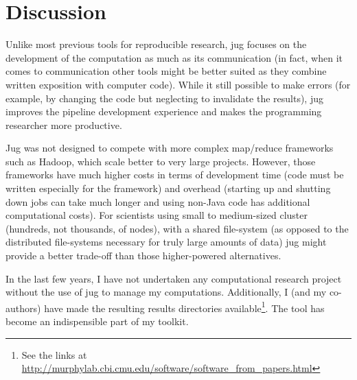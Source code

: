 \documentclass{article}
\begin{document}
\section{Discussion}
Unlike most previous tools for reproducible research, jug focuses on the
development of the computation as much as its communication (in fact, when it
comes to communication other tools might be better suited as they combine
written exposition with computer code). While it still possible to make errors
(for example, by changing the code but neglecting to invalidate the results),
jug improves the pipeline development experience and makes the programming
researcher more productive.

Jug was not designed to compete with more complex map/reduce frameworks such as
Hadoop, which scale better to very large projects. However, those frameworks
have much higher costs in terms of development time (code must be written
especially for the framework) and overhead (starting up and shutting down jobs
can take much longer and using non-Java code has additional computational
costs). For scientists using small to medium-sized cluster (hundreds, not
thousands, of nodes), with a shared file-system (as opposed to the distributed
file-systems necessary for truly large amounts of data) jug might provide a
better trade-off  than those higher-powered alternatives.

In the last few years, I have not undertaken any computational research project
without the use of jug to manage my computations. Additionally, I (and my
co-authors) have made the resulting results directories available\footnote{See
the links at
\url{http://murphylab.cbi.cmu.edu/software/software_from_papers.html}}. The
tool has become an indispensible part of my toolkit.

\printbibliography
\end{document}
